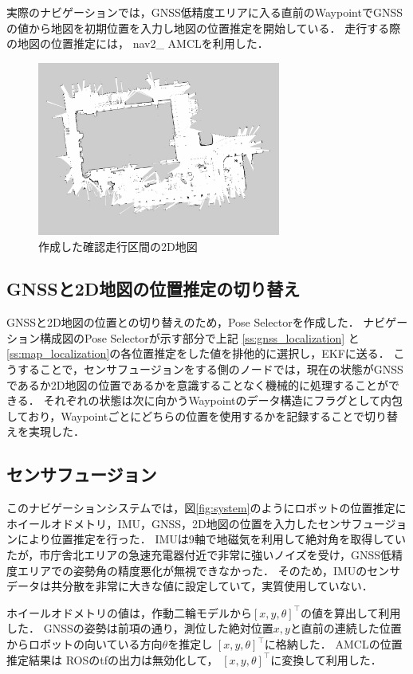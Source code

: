 \documentclass[platex,dvipdfmx]{rbproceedings}
\begin{document}
実際のナビゲーションでは，GNSS低精度エリアに入る直前のWaypointでGNSSの値から地図を初期位置を入力し地図の位置推定を開始している．
走行する際の地図の位置推定には， nav2\_ AMCL\cite{nav2}を利用した．
\begin{figure}[htbp]
    \centering   
    \includegraphics[keepaspectratio,width=80mm]{fig/map.png}
    \caption{作成した確認走行区間の2D地図}
    \label{fig:map}
\end{figure}

\subsection{GNSSと2D地図の位置推定の切り替え}
GNSSと2D地図の位置との切り替えのため，Pose Selectorを作成した．
ナビゲーション構成図のPose Selectorが示す部分で上記 \ref{ss:gnss_localization} と  \ref{ss:map_localization}の各位置推定をした値を排他的に選択し，EKFに送る．
こうすることで，センサフュージョンをする側のノードでは，現在の状態がGNSSであるか2D地図の位置であるかを意識することなく機械的に処理することができる．
それぞれの状態は次に向かうWaypointのデータ構造にフラグとして内包しており，Waypointごとにどちらの位置を使用するかを記録することで切り替えを実現した．


\subsection{センサフュージョン}\label{ss:sensor_fusion}
このナビゲーションシステムでは，図\ref{fig:system}のようにロボットの位置推定にホイールオドメトリ，IMU，GNSS，2D地図の位置を入力したセンサフュージョンにより位置推定を行った．
IMUは9軸で地磁気を利用して絶対角を取得していたが，市庁舎北エリアの急速充電器付近で非常に強いノイズを受け，GNSS低精度エリアでの姿勢角の精度悪化が無視できなかった．
そのため，IMUのセンサデータは共分散を非常に大きな値に設定していて，実質使用していない．

ホイールオドメトリの値は，作動二輪モデルから$\left[ x, y, \theta \right] ^\top$の値を算出して利用した．
GNSSの姿勢は前項の通り，測位した絶対位置$x, y$と直前の連続した位置からロボットの向いている方向$\theta$を推定し $\left[ x, y, \theta \right] ^\top$に格納した．
AMCLの位置推定結果は ROSのtfの出力は無効化して，  $\left[ x, y, \theta \right] ^\top$に変換して利用した．
\end{document}

